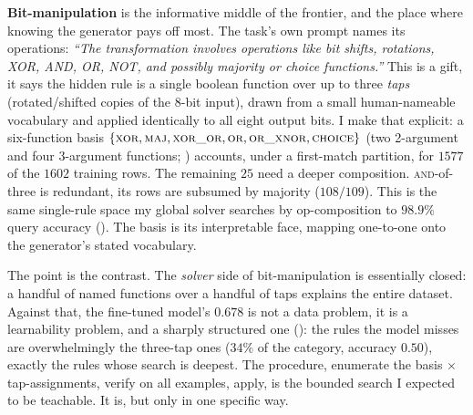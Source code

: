 \documentclass[11pt]{article}
\begin{document}
\textbf{Bit-manipulation} is the informative middle of the frontier, and the place where
knowing the generator pays off most. The task's own prompt names its operations:
\emph{``The transformation involves operations like bit shifts, rotations, XOR, AND, OR, NOT,
and possibly majority or choice functions.''} This is a gift, it says the hidden rule is a
single boolean function over up to three \emph{taps} (rotated/shifted copies of the 8-bit
input), drawn from a small human-nameable vocabulary and applied identically to all eight
output bits. I make that explicit: a six-function basis $\{\textsc{xor}, \textsc{maj},
\textsc{xor\_or}, \textsc{or}, \textsc{or\_xnor}, \textsc{choice}\}$ (two 2-argument and four
3-argument functions; ) accounts, under a first-match partition, for $1577$
of the $1602$ training rows. The remaining $25$ need a deeper composition. \textsc{and}-of-three
is redundant, its rows are subsumed by majority ($108/109$). This is the same single-rule
space my global solver searches by op-composition to $98.9\%$ query accuracy
(). The basis is its interpretable face, mapping one-to-one onto the
generator's stated vocabulary.

The point is the contrast. The \emph{solver} side of bit-manipulation is essentially closed:
a handful of named functions over a handful of taps explains the entire dataset. Against
that, the fine-tuned model's $0.678$ is not a data problem, it is a learnability problem,
and a sharply structured one (): the rules the model misses are
overwhelmingly the three-tap ones ($34\%$ of the category, accuracy $0.50$), exactly the
rules whose search is deepest. The procedure, enumerate the basis $\times$ tap-assignments,
verify on all examples, apply, is the bounded search I expected to be teachable. It is, but
only in one specific way.
\end{document}
